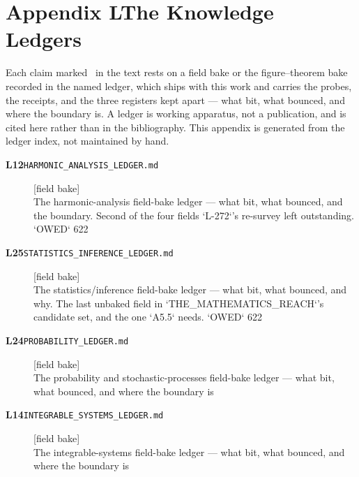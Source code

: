 \clearpage
\section*{Appendix L\quad The Knowledge Ledgers}\label{app:ledgers}
\small\noindent Each claim marked \ldgmarker\ in the text rests on a field bake or the figure--theorem bake recorded in the named ledger, which ships with this work and carries the probes, the receipts, and the three registers kept apart --- what bit, what bounced, and where the boundary is. A ledger is working apparatus, not a publication, and is cited here rather than in the bibliography. This appendix is generated from the ledger index, not maintained by hand.\par\medskip
\begingroup\renewcommand{\arraystretch}{1.25}
\begin{description}
\item[\textbf{L12}\quad\texttt{HARMONIC\_ANALYSIS\_LEDGER.md}]\hfill\textsf{[field bake]}\\
The harmonic-analysis field-bake ledger --- what bit, what bounced, and the boundary. Second of the four fields `L-272`'s re-survey left outstanding. `OWED` 622
\item[\textbf{L25}\quad\texttt{STATISTICS\_INFERENCE\_LEDGER.md}]\hfill\textsf{[field bake]}\\
The statistics/inference field-bake ledger --- what bit, what bounced, and why. The last unbaked field in `THE\_MATHEMATICS\_REACH`'s candidate set, and the one `A5.5` needs. `OWED` 622
\item[\textbf{L24}\quad\texttt{PROBABILITY\_LEDGER.md}]\hfill\textsf{[field bake]}\\
The probability and stochastic-processes field-bake ledger --- what bit, what bounced, and where the boundary is
\item[\textbf{L14}\quad\texttt{INTEGRABLE\_SYSTEMS\_LEDGER.md}]\hfill\textsf{[field bake]}\\
The integrable-systems field-bake ledger --- what bit, what bounced, and where the boundary is
\end{description}
\endgroup
